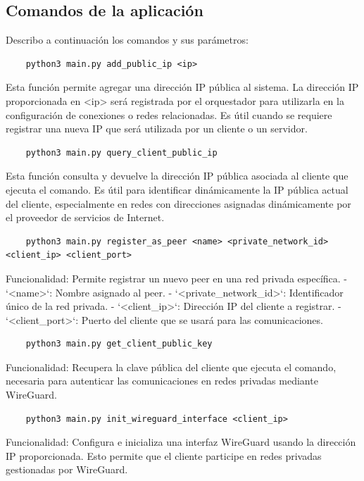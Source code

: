 \subsection*{Comandos de la aplicación}
Describo a continuación los comandos y sus parámetros: 
    \begin{verbatim}
    python3 main.py add_public_ip <ip>
    \end{verbatim}

    Esta función permite agregar una dirección IP pública al sistema. La dirección IP proporcionada en <ip> será registrada por el orquestador para utilizarla en la configuración de conexiones o redes relacionadas. Es útil cuando se requiere registrar una nueva IP que será utilizada por un cliente o un servidor.
    
    \begin{verbatim}
    python3 main.py query_client_public_ip
    \end{verbatim}

    Esta función consulta y devuelve la dirección IP pública asociada al cliente que ejecuta el comando. Es útil para identificar dinámicamente la IP pública actual del cliente, especialmente en redes con direcciones asignadas dinámicamente por el proveedor de servicios de Internet.
    
\begin{verbatim}
    python3 main.py register_as_peer <name> <private_network_id> <client_ip> <client_port>
    \end{verbatim}
    Funcionalidad:  
    Permite registrar un nuevo peer en una red privada específica.  
    - `<name>`: Nombre asignado al peer.
    - `<private_network_id>`: Identificador único de la red privada.
    - `<client_ip>`: Dirección IP del cliente a registrar.
    - `<client_port>`: Puerto del cliente que se usará para las comunicaciones.
    
    \begin{verbatim}
    python3 main.py get_client_public_key
    \end{verbatim}
    Funcionalidad:  
    Recupera la clave pública del cliente que ejecuta el comando, necesaria para autenticar las comunicaciones en redes privadas mediante WireGuard.
    
   
    
    \begin{verbatim}
    python3 main.py init_wireguard_interface <client_ip>
    \end{verbatim}
    Funcionalidad:  
    Configura e inicializa una interfaz WireGuard usando la dirección IP proporcionada. Esto permite que el cliente participe en redes privadas gestionadas por WireGuard.
    
